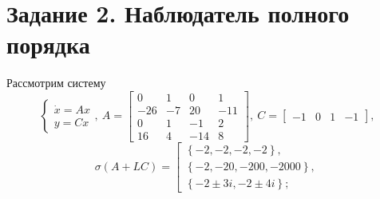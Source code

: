 \documentclass[a4paper, 12pt]{article}
\begin{document}
    \section{Задание 2. Наблюдатель полного порядка}
    Рассмотрим систему
    $$
    \begin{cases}
        \dot{x}=Ax\\
        y=Cx
    \end{cases},\ A=\begin{bmatrix}
        0 &1 &0 &1\\
        -26 &-7 &20 &-11\\
        0 &1 &-1 &2\\
        16 &4 &-14 &8
    \end{bmatrix},\ C=\begin{bmatrix}
        -1 &0 &1 &-1
    \end{bmatrix},
    $$
    $$
    \sigma\left(A+LC\right)= 
    \left[ 
      \begin{gathered} 
        \left\{-2,-2,-2, -2\right\}, \\ 
        \left\{-2,-20,-200, -2000\right\},\\
        \left\{-2\pm3i,-2\pm4i\right\};
      \end{gathered} 
\right.
    $$
\end{document}
